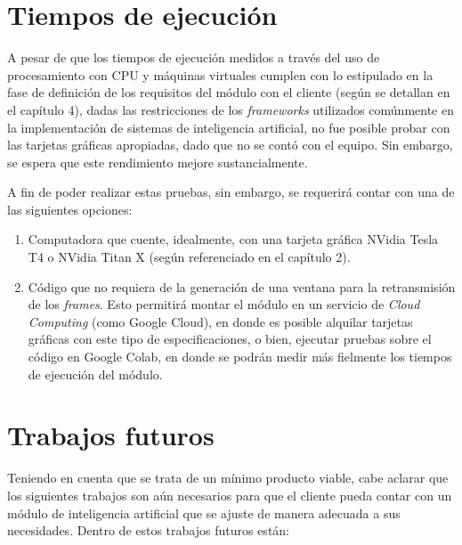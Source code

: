 \section{Tiempos de ejecución}

A pesar de que los tiempos de ejecución medidos a través del uso de procesamiento con CPU y máquinas virtuales cumplen con lo estipulado en la fase de definición de los requisitos del módulo con el cliente (según se detallan en el capítulo 4), dadas las restricciones de los \textit{frameworks} utilizados comúnmente en la implementación de sistemas de inteligencia artificial, no fue posible probar con las tarjetas gráficas apropiadas, dado que no se contó con el equipo. Sin embargo, se espera que este rendimiento mejore sustancialmente.

A fin de poder realizar estas pruebas, sin embargo, se requerirá contar con una de las siguientes opciones:

\begin{enumerate}

	\item Computadora que cuente, idealmente, con una tarjeta gráfica NVidia Tesla T4 o NVidia Titan X (según referenciado en el capítulo 2).
	
	\item Código que no requiera de la generación de una ventana para la retransmisión de los \textit{frames}. Esto permitirá montar el módulo en un servicio de \textit{Cloud Computing} (como Google Cloud), en donde es posible alquilar tarjetas gráficas con este tipo de especificaciones, o bien, ejecutar pruebas sobre el código en Google Colab, en donde se podrán medir más fielmente los tiempos de ejecución del módulo. 

\end{enumerate}

\section{Trabajos futuros}

Teniendo en cuenta que se trata de un mínimo producto viable, cabe aclarar que los siguientes trabajos son aún necesarios para que el cliente pueda contar con un módulo de inteligencia artificial que se ajuste de manera adecuada a sus necesidades. Dentro de estos trabajos futuros están:

